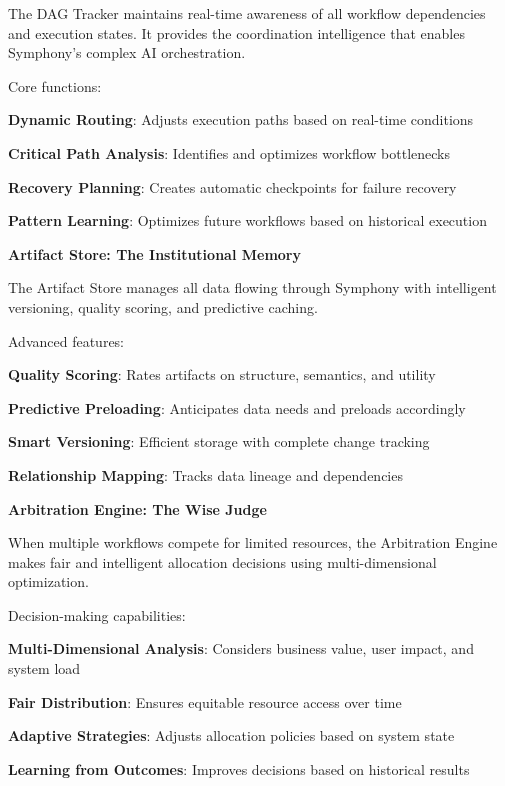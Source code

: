 The DAG Tracker maintains real-time awareness of all workflow dependencies and execution states. It provides the coordination intelligence that enables Symphony's complex AI orchestration.

Core functions:
\begin{compactlist}
    \item \textbf{Dynamic Routing}: Adjusts execution paths based on real-time conditions
    \item \textbf{Critical Path Analysis}: Identifies and optimizes workflow bottlenecks
    \item \textbf{Recovery Planning}: Creates automatic checkpoints for failure recovery
    \item \textbf{Pattern Learning}: Optimizes future workflows based on historical execution
\end{compactlist}

\textbf{Artifact Store: The Institutional Memory}

The Artifact Store manages all data flowing through Symphony with intelligent versioning, quality scoring, and predictive caching.

Advanced features:
\begin{compactlist}
    \item \textbf{Quality Scoring}: Rates artifacts on structure, semantics, and utility
    \item \textbf{Predictive Preloading}: Anticipates data needs and preloads accordingly
    \item \textbf{Smart Versioning}: Efficient storage with complete change tracking
    \item \textbf{Relationship Mapping}: Tracks data lineage and dependencies
\end{compactlist}

\textbf{Arbitration Engine: The Wise Judge}

When multiple workflows compete for limited resources, the Arbitration Engine makes fair and intelligent allocation decisions using multi-dimensional optimization.

Decision-making capabilities:
\begin{compactlist}
    \item \textbf{Multi-Dimensional Analysis}: Considers business value, user impact, and system load
    \item \textbf{Fair Distribution}: Ensures equitable resource access over time
    \item \textbf{Adaptive Strategies}: Adjusts allocation policies based on system state
    \item \textbf{Learning from Outcomes}: Improves decisions based on historical results
\end{compactlist}

